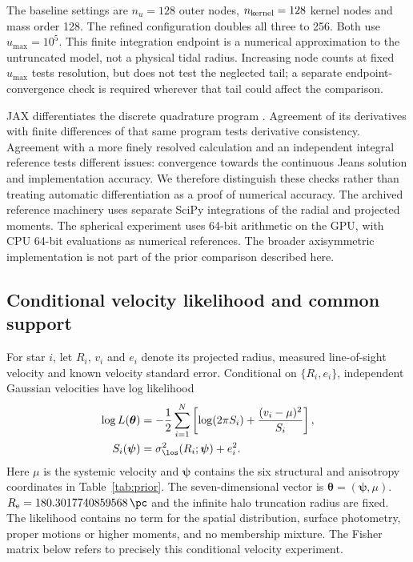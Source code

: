 The baseline settings are $n_u=128$ outer nodes, $n_{\rm kernel}=128$ kernel nodes and mass order 128. The refined configuration doubles all three to 256. Both use $u_{\max}=10^5$. This finite integration endpoint is a numerical approximation to the untruncated model, not a physical tidal radius. Increasing node counts at fixed $u_{\max}$ tests resolution, but does not test the neglected tail; a separate endpoint-convergence check is required wherever that tail could affect the comparison.

JAX differentiates the discrete quadrature program \citep{jax2018}. Agreement of its derivatives with finite differences of that same program tests derivative consistency. Agreement with a more finely resolved calculation and an independent integral reference tests different issues: convergence towards the continuous Jeans solution and implementation accuracy. We therefore distinguish these checks rather than treating automatic differentiation as a proof of numerical accuracy. The archived reference machinery uses separate SciPy integrations of the radial and projected moments. The spherical experiment uses 64-bit arithmetic on the GPU, with CPU 64-bit evaluations as numerical references. The broader axisymmetric implementation is not part of the prior comparison described here.

\subsection{Conditional velocity likelihood and common support}
\label{sec:likelihood}
For star $i$, let $R_i$, $v_i$ and $e_i$ denote its projected radius, measured line-of-sight velocity and known velocity standard error. Conditional on $\{R_i,e_i\}$, independent Gaussian velocities have log likelihood
\begin{align}
 \log L(\boldsymbol{\theta})
  &=-\frac{1}{2}\sum_{i=1}^{N}
    \left[\log(2\pi S_i)+\frac{(v_i-\mu)^2}{S_i}\right],\label{eq:likelihood}\\
 S_i(\boldsymbol{\psi})
  &=\sigma_{\los}^2(R_i;\boldsymbol{\psi})+e_i^2 .
 \label{eq:variance}
\end{align}
Here $\mu$ is the systemic velocity and $\boldsymbol{\psi}$ contains the six structural and anisotropy coordinates in Table~\ref{tab:prior}. The seven-dimensional vector is $\boldsymbol{\theta}=(\boldsymbol{\psi},\mu)$. $R_{\rm e}=180.3017740859568\,\pc$ and the infinite halo truncation radius are fixed. The likelihood contains no term for the spatial distribution, surface photometry, proper motions or higher moments, and no membership mixture. The Fisher matrix below refers to precisely this conditional velocity experiment.

